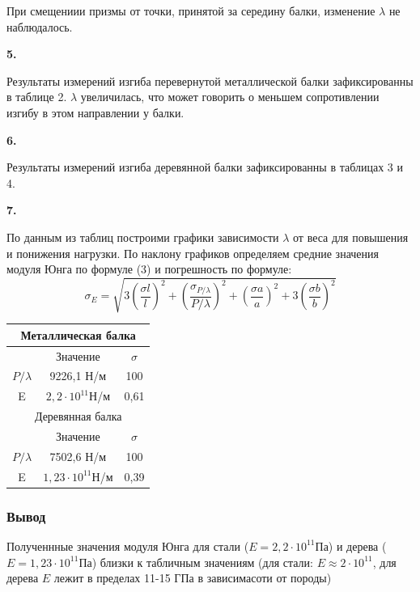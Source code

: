 \documentclass{article}
\begin{document}
\noindent
При смещениии призмы от точки, принятой за середину балки, изменение $\lambda$ не наблюдалось.

\noindent
\textbf{5.}

\noindent
Результаты измерений изгиба перевернутой металлической балки зафиксированны в таблице 2. $\lambda$ увеличилась, что может говорить о меньшем сопротивлении изгибу в этом направлении у балки.

\noindent
\textbf{6.}

\noindent
Результаты измерений изгиба деревянной балки зафиксированны в таблицах 3 и 4.

\noindent
\textbf{7.}

\noindent
По данным из таблиц построими графики зависимости $\lambda$ от веса для повышения и понижения нагрузки.
По наклону графиков определяем средние значения модуля Юнга по формуле (3) и погрешность по формуле: $$\sigma_E = \sqrt{3(\frac{\sigma l}{l})^2 + (\frac{\sigma_{P/\lambda}}{P/\lambda})^2 + (\frac{\sigma a}{a})^2 + 3(\frac{\sigma b}{b})^2}$$

\begin{table}[!h]
    \centering
    \begin{tabular}{|c|c|c}
         \hline
         \multicolumn{3}{|c|}{ Металлическая балка} \\
         \hline
                        & Значение             & $\sigma$ \\
            $P/\lambda$ & 9226,1 Н/м           &    100   \\
                  E     & $2,2\cdot10^{11}$Н/м &    0,61  \\
         \hline
         \multicolumn{3}{|c|}{Деревянная балка} \\
         \hline
                        & Значение              & $\sigma$ \\
            $P/\lambda$ & 7502,6 Н/м            & 100      \\
                 E      & $1,23\cdot10^{11}$Н/м & 0,39     \\
         \hline
    \end{tabular}
\end{table}

\subsubsection*{Вывод}
Полученнные значения модуля Юнга для стали ($E = 2,2\cdot10^{11}$Па) и дерева ($E = 1,23\cdot10^{11}$Па) близки к табличным значениям (для стали: $E\approx2\cdot10^{11}$, для дерева $E$ лежит в пределах 11-15 ГПа в зависимасоти от породы)
\end{document}
